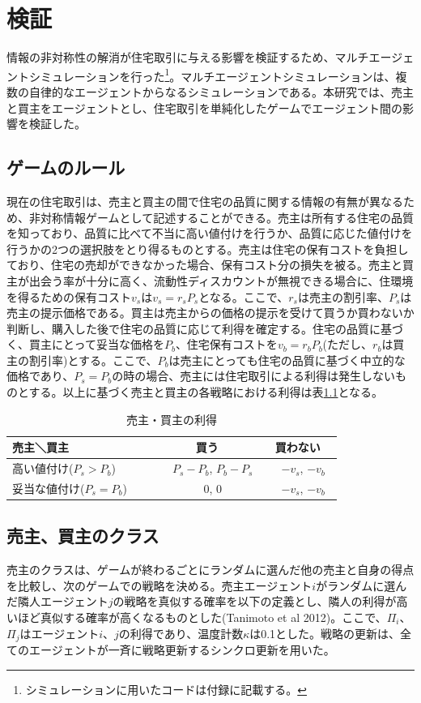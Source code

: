 \documentclass[a4paper,fontsize=11pt,report,notitlepage,line_length=38zw,number_of_lines=40,dvipdfmx]{jlreq}
\begin{document}
\chapter{検証}
情報の非対称性の解消が住宅取引に与える影響を検証するため、マルチエージェントシミュレーションを行った\footnote{シミュレーションに用いたコードは付録に記載する。}。マルチエージェントシミュレーションは、複数の自律的なエージェントからなるシミュレーションである。本研究では、売主と買主をエージェントとし、住宅取引を単純化したゲームでエージェント間の影響を検証した。

\section{ゲームのルール}
現在の住宅取引は、売主と買主の間で住宅の品質に関する情報の有無が異なるため、非対称情報ゲームとして記述することができる。売主は所有する住宅の品質を知っており、品質に比べて不当に高い値付けを行うか、品質に応じた値付けを行うかの2つの選択肢をとり得るものとする。売主は住宅の保有コストを負担しており、住宅の売却ができなかった場合、保有コスト分の損失を被る。売主と買主が出会う率が十分に高く、流動性ディスカウントが無視できる場合に、住環境を得るための保有コスト$v_s$は$v_s=r_sP_s$となる。ここで、$r_s$は売主の割引率、$P_s$は売主の提示価格である。買主は売主からの価格の提示を受けて買うか買わないか判断し、購入した後で住宅の品質に応じて利得を確定する。住宅の品質に基づく、買主にとって妥当な価格を$P_b$、住宅保有コストを$v_b=r_bP_b$(ただし、$r_b$は買主の割引率)とする。ここで、$P_b$は売主にとっても住宅の品質に基づく中立的な価格であり、$P_s=P_b$の時の場合、売主には住宅取引による利得は発生しないものとする。以上に基づく売主と買主の各戦略における利得は表\ref{ritoku}となる。

\begin{table}
\begin{center}
\caption{売主・買主の利得}
\label{ritoku}
\begin{tabular}{l|cc}
売主＼買主 & 買う & 買わない \\ \hline
高い値付け($P_s>P_b$)　　 & 　$P_s-P_b$,  $P_b-P_s$ & 　$-v_s$,  $-v_b$　 \\
妥当な値付け($P_s=P_b$)　　 & 　0, 0 & 　$-v_s$,  $-v_b$　
\end{tabular}
\end{center}
\end{table}%

\section{売主、買主のクラス}
売主のクラスは、ゲームが終わるごとにランダムに選んだ他の売主と自身の得点を比較し、次のゲームでの戦略を決める。売主エージェント$i$がランダムに選んだ隣人エージェント$j$の戦略を真似する確率を以下の定義とし、隣人の利得が高いほど真似する確率が高くなるものとした(Tanimoto et al 2012)\cite{tanimoto2012}。ここで、$\Pi_i$、$\Pi_j$はエージェント$i$、$j$の利得であり、温度計数$\kappa$は0.1とした。戦略の更新は、全てのエージェントが一斉に戦略更新するシンクロ更新を用いた。
\end{document}
